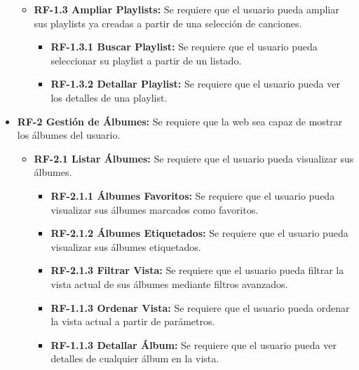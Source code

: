 \begin{itemize}
\begin{itemize}
            \item
                \textbf{RF-1.3 Ampliar Playlists:} Se requiere que el usuario pueda ampliar sus playlists ya creadas a partir de una selección de canciones.
                \begin{itemize}
                    \item
                        \textbf{RF-1.3.1 Buscar Playlist:} Se requiere que el usuario pueda seleccionar su playlist a partir de un listado.
                    \item
                        \textbf{RF-1.3.2 Detallar Playlist:} Se requiere que el usuario pueda ver los detalles de una playlist.
                \end{itemize}
        \end{itemize}
    

        
    \item  
        \textbf{RF-2 Gestión de Álbumes:} Se requiere que la web sea capaz de mostrar los álbumes del usuario.
        \begin{itemize}
            \item 
                \textbf{RF-2.1 Listar Álbumes:} Se requiere que el usuario pueda visualizar sus álbumes.
                \begin{itemize}
                    \item 
                        \textbf{RF-2.1.1 Álbumes Favoritos:} Se requiere que el usuario pueda visualizar sus álbumes marcados como favoritos.
                    \item 
                        \textbf{RF-2.1.2 Álbumes Etiquetados:} Se requiere que el usuario pueda visualizar sus álbumes etiquetados.
                        
                    \item
                        \textbf{RF-2.1.3 Filtrar Vista:} Se requiere que el usuario pueda filtrar la vista actual de sus álbumes mediante filtros avanzados.
                    \item
                        \textbf{RF-1.1.3 Ordenar Vista:} Se requiere que el usuario pueda ordenar la vista actual a partir de parámetros.
                    \item
                        \textbf{RF-1.1.3 Detallar Álbum:} Se requiere que el usuario pueda ver detalles de cualquier álbum en la vista. 
                \end{itemize}
                

\end{itemize}
\end{itemize}
